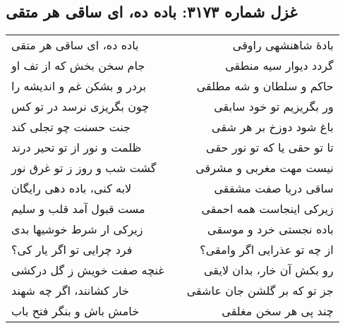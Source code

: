 \begin{center}
\section*{غزل شماره ۳۱۷۳: باده ده، ای ساقی هر متقی}
\label{sec:3173}
\begin{longtable}{l p{0.5cm} r}
باده ده، ای ساقی هر متقی
&&
بادهٔ شاهنشهی راوقی
\\
جام سخن بخش که از تف او
&&
گردد دیوار سیه منطقی
\\
بردر و بشکن غم و اندیشه را
&&
حاکم و سلطان و شه مطلقی
\\
چون بگریزی نرسد در تو کس
&&
ور بگریزیم تو خود سابقی
\\
جنت حسنت چو تجلی کند
&&
باغ شود دوزخ بر هر شقی
\\
ظلمت و نور از تو تحیر درند
&&
تا تو حقی یا که تو نور حقی
\\
گشت شب و روز ز تو غرق نور
&&
نیست مهت مغربی و مشرقی
\\
لابه کنی، باده دهی رایگان
&&
ساقی دریا صفت مشفقی
\\
مست قبول آمد قلب و سلیم
&&
زیرکی اینجاست همه احمقی
\\
زیرکی ار شرط خوشیها بدی
&&
باده نجستی خرد و موسقی
\\
فرد چرایی تو اگر یار کی؟
&&
از چه تو عذرایی اگر وامقی؟
\\
غنچه صفت خویش ز گل درکشی
&&
رو بکش آن خار، بدان لایقی
\\
خار کشانند، اگر چه شهند
&&
جز تو که بر گلشن جان عاشقی
\\
خامش باش و بنگر فتح باب
&&
چند پی هر سخن مغلقی
\\
\end{longtable}
\end{center}
